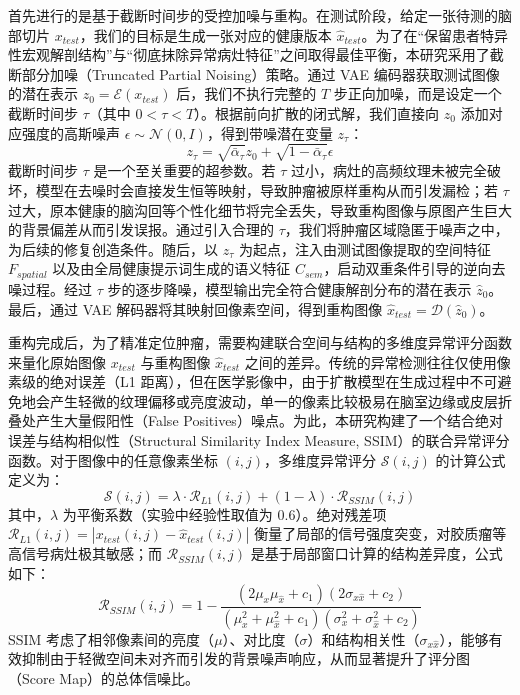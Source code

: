 \documentclass[Win]{xjtuBSThesis}  %
\begin{document}
首先进行的是基于截断时间步的受控加噪与重构。在测试阶段，给定一张待测的脑部切片 $x_{test}$，我们的目标是生成一张对应的健康版本 $\hat{x}_{test}$。为了在“保留患者特异性宏观解剖结构”与“彻底抹除异常病灶特征”之间取得最佳平衡，本研究采用了截断部分加噪（Truncated Partial Noising）策略。通过 VAE 编码器获取测试图像的潜在表示 $z_0 = \mathcal{E}(x_{test})$ 后，我们不执行完整的 $T$ 步正向加噪，而是设定一个截断时间步 $\tau$（其中 $0 < \tau < T$）。根据前向扩散的闭式解，我们直接向 $z_0$ 添加对应强度的高斯噪声 $\epsilon \sim \mathcal{N}(0, I)$，得到带噪潜在变量 $z_\tau$：
$$z_\tau = \sqrt{\bar{\alpha}_\tau} z_0 + \sqrt{1 - \bar{\alpha}_\tau} \epsilon$$
截断时间步 $\tau$ 是一个至关重要的超参数。若 $\tau$ 过小，病灶的高频纹理未被完全破坏，模型在去噪时会直接发生恒等映射，导致肿瘤被原样重构从而引发漏检；若 $\tau$ 过大，原本健康的脑沟回等个性化细节将完全丢失，导致重构图像与原图产生巨大的背景偏差从而引发误报。通过引入合理的 $\tau$，我们将肿瘤区域隐匿于噪声之中，为后续的修复创造条件。随后，以 $z_\tau$ 为起点，注入由测试图像提取的空间特征 $F_{spatial}$ 以及由全局健康提示词生成的语义特征 $C_{sem}$，启动双重条件引导的逆向去噪过程。经过 $\tau$ 步的逐步降噪，模型输出完全符合健康解剖分布的潜在表示 $\hat{z}_0$。最后，通过 VAE 解码器将其映射回像素空间，得到重构图像 $\hat{x}_{test} = \mathcal{D}(\hat{z}_0)$。

重构完成后，为了精准定位肿瘤，需要构建联合空间与结构的多维度异常评分函数来量化原始图像 $x_{test}$ 与重构图像 $\hat{x}_{test}$ 之间的差异。传统的异常检测往往仅使用像素级的绝对误差（L1 距离），但在医学影像中，由于扩散模型在生成过程中不可避免地会产生轻微的纹理偏移或亮度波动，单一的像素比较极易在脑室边缘或皮层折叠处产生大量假阳性（False Positives）噪点。为此，本研究构建了一个结合绝对误差与结构相似性（Structural Similarity Index Measure, SSIM）的联合异常评分函数。对于图像中的任意像素坐标 $(i, j)$，多维度异常评分 $\mathcal{S}(i, j)$ 的计算公式定义为：
$$\mathcal{S}(i, j) = \lambda \cdot \mathcal{R}_{L1}(i, j) + (1 - \lambda) \cdot \mathcal{R}_{SSIM}(i, j)$$
其中，$\lambda$ 为平衡系数（实验中经验性取值为 0.6）。绝对残差项 $\mathcal{R}_{L1}(i, j) = \left| x_{test}(i, j) - \hat{x}_{test}(i, j) \right|$ 衡量了局部的信号强度突变，对胶质瘤等高信号病灶极其敏感；而 $\mathcal{R}_{SSIM}(i, j)$ 是基于局部窗口计算的结构差异度，公式如下：
$$\mathcal{R}_{SSIM}(i, j) = 1 - \frac{(2\mu_x\mu_{\hat{x}} + c_1)(2\sigma_{x\hat{x}} + c_2)}{(\mu_x^2 + \mu_{\hat{x}}^2 + c_1)(\sigma_x^2 + \sigma_{\hat{x}}^2 + c_2)}$$
SSIM 考虑了相邻像素间的亮度（$\mu$）、对比度（$\sigma$）和结构相关性（$\sigma_{x\hat{x}}$），能够有效抑制由于轻微空间未对齐而引发的背景噪声响应，从而显著提升了评分图（Score Map）的总体信噪比。
\end{document}
